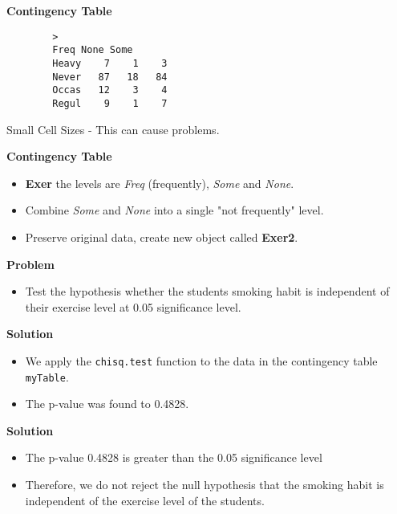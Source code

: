 \documentclass[a4paper,12pt]{article}
\begin{document}
	
	
	
	\textbf{Contingency Table }
	\begin{framed}
		\begin{verbatim}
		>    
		Freq None Some 
		Heavy    7    1    3 
		Never   87   18   84 
		Occas   12    3    4 
		Regul    9    1    7
		\end{verbatim}
	\end{framed}
	Small Cell Sizes - This can cause problems. 
	
	
	
	
	\textbf{Contingency Table }
	
	
	\begin{itemize}
		\item \textbf{Exer} the levels are \textit{Freq} (frequently), \textit{Some} and \textit{None}.
		\item Combine \textit{Some} and \textit{None} into a  single "not frequently" level.
		\item Preserve original data, create new object called \textbf{Exer2}.
	\end{itemize}
	

	\textbf{Problem}\\
	\begin{itemize}
		\item Test the hypothesis whether the students smoking habit is independent of their exercise level at 0.05 significance level.
	\end{itemize}
	
	\textbf{Solution}\\
	\begin{itemize}
		\item We apply the \texttt{chisq.test} function to the data in the contingency table \texttt{myTable}.
		\item The p-value was found to 0.4828.
	\end{itemize}
	
	
	
	
	\textbf{Solution}\\
	\begin{itemize}
		\item The p-value 0.4828 is greater than the 0.05 significance level \bigskip
		\item Therefore, we do not reject the null hypothesis that the smoking habit is independent of the exercise level of the students.
	\end{itemize}
	
\end{document}

